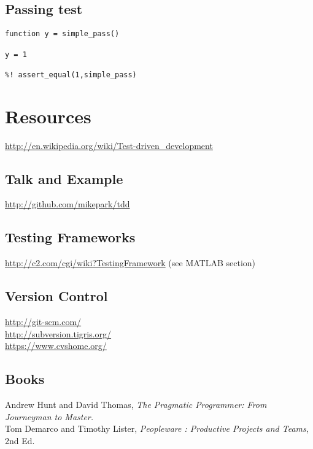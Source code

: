 \documentclass[twocolumn]{article}
\begin{document}
  \subsection{Passing test}
  \begin{verbatim}
function y = simple_pass()

y = 1

%! assert_equal(1,simple_pass)
  \end{verbatim}
  \section{Resources}

  \url{http://en.wikipedia.org/wiki/Test-driven_development}

  \subsection{Talk and Example}  
  \url{http://github.com/mikepark/tdd}

  \subsection{Testing Frameworks}  
  \url{http://c2.com/cgi/wiki?TestingFramework} (see MATLAB section)

  \subsection{Version Control}
  \url{http://git-scm.com/} \\
  \url{http://subversion.tigris.org/}\\
  \url{https://www.cvshome.org/}\

  \subsection{Books}
  Andrew Hunt and David Thomas,
  \textit{The Pragmatic Programmer: From Journeyman to Master.}\\
  Tom Demarco and Timothy Lister,
  \textit{Peopleware : Productive Projects and Teams}, 2nd Ed.
\end{document}
